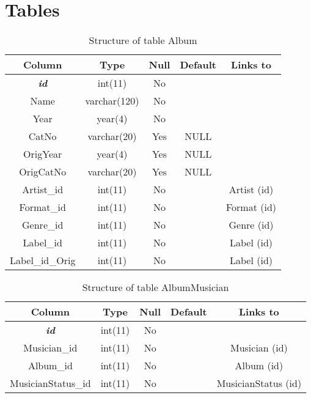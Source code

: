 \chapter*{Tables}
{}
\renewcommand\thetable{1.\arabic{table}}
\setcounter{table}{0}

%
%
\begin{longtable}{|c|c|c|c|c|} 
\caption{Structure of table Album} 
\label{tab:Album-structure} \\
\hline 
\multicolumn{1}{|c|}{\textbf{Column}} & \multicolumn{1}{|c|}{\textbf{Type}} & \multicolumn{1}{|c|}{\textbf{Null}} & \multicolumn{1}{|c|}{\textbf{Default}} & \multicolumn{1}{|c|}{\textbf{Links to}} \\
\hline
\textbf{\textit{id}} & int(11) & No &  &  \\ 
\hline 
Name & varchar(120) & No &  &  \\ 
\hline 
Year & year(4) & No &  &  \\ 
\hline 
CatNo & varchar(20) & Yes & NULL &  \\ 
\hline 
OrigYear & year(4) & Yes & NULL &  \\ 
\hline 
OrigCatNo & varchar(20) & Yes & NULL &  \\ 
\hline 
Artist\_id & int(11) & No &  & Artist (id) \\ 
\hline 
Format\_id & int(11) & No &  & Format (id) \\ 
\hline 
Genre\_id & int(11) & No &  & Genre (id) \\ 
\hline 
Label\_id & int(11) & No &  & Label (id) \\ 
\hline 
Label\_id\_Orig & int(11) & No &  & Label (id) \\ 
\hline 
\end{longtable}

%
%
\begin{longtable}{|c|c|c|c|c|} 
\caption{Structure of table AlbumMusician} 
\label{tab:AlbumMusician-structure} \\
\hline 
\multicolumn{1}{|c|}{\textbf{Column}} & \multicolumn{1}{|c|}{\textbf{Type}} & \multicolumn{1}{|c|}{\textbf{Null}} & \multicolumn{1}{|c|}{\textbf{Default}} & \multicolumn{1}{|c|}{\textbf{Links to}} \\ 
\hline
\textbf{\textit{id}} & int(11) & No &  &  \\ 
\hline 
Musician\_id & int(11) & No &  & Musician (id) \\ 
\hline 
Album\_id & int(11) & No &  & Album (id) \\ 
\hline 
MusicianStatus\_id & int(11) & No &  & MusicianStatus (id) \\ 
\hline 
\end{longtable}


